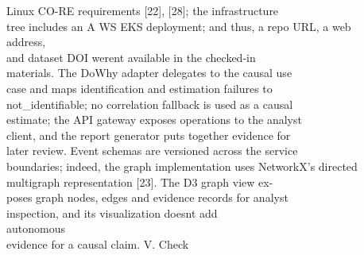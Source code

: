 \documentclass[conference]{IEEEtran}
\begin{document}
Linux CO-RE requirements {[}22{]}, {[}28{]}; the infrastructure\\
tree includes an A WS EKS deployment; and thus, a repo URL, a web\\
address,\\
and dataset DOI weren\textquotesingle t available in the checked-in\\
materials. The DoWhy adapter delegates to the causal use\\
case and maps identification and estimation failures to\\
not\_identifiable; no correlation fallback is used as a causal\\
estimate; the API gateway exposes operations to the analyst\\
client, and the report generator puts together evidence for\\
later review. Event schemas are versioned across the service\\
boundaries; indeed, the graph implementation uses NetworkX's directed\\
multigraph representation {[}23{]}. The D3 graph view ex-\\
poses graph nodes, edges and evidence records for analyst\\
inspection, and its visualization doesn\textquotesingle t add\\
autonomous\\
evidence for a causal claim. V. Check\\
\end{document}
